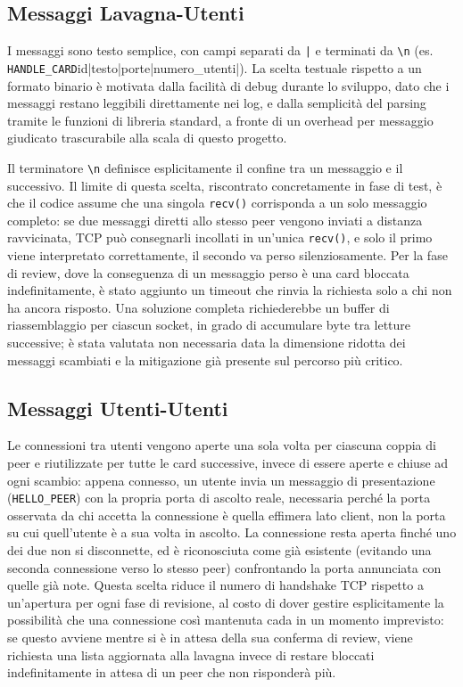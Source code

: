 \documentclass{article}
\begin{document}
\subsection{Messaggi Lavagna-Utenti}
I messaggi sono testo semplice, con campi separati da \verb`|` e terminati da \verb|\n| (es. \verb|HANDLE_CARD|id|testo|porte|numero\_utenti|). La scelta testuale rispetto a un formato binario è motivata dalla facilità di debug durante lo sviluppo, dato che i messaggi restano leggibili direttamente nei log, e dalla semplicità del parsing tramite le funzioni di libreria standard, a fronte di un overhead per messaggio giudicato trascurabile alla scala di questo progetto.

Il terminatore \verb|\n| definisce esplicitamente il confine tra un messaggio e il successivo. Il limite di questa scelta, riscontrato concretamente in fase di test, è che il codice assume che una singola \verb|recv()| corrisponda a un solo messaggio completo: se due messaggi diretti allo stesso peer vengono inviati a distanza ravvicinata, TCP può consegnarli incollati in un'unica \verb|recv()|, e solo il primo viene interpretato correttamente, il secondo va perso silenziosamente. Per la fase di review, dove la conseguenza di un messaggio perso è una card bloccata indefinitamente, è stato aggiunto un timeout che rinvia la richiesta solo a chi non ha ancora risposto. Una soluzione completa richiederebbe un buffer di riassemblaggio per ciascun socket, in grado di accumulare byte tra letture successive; è stata valutata non necessaria data la dimensione ridotta dei messaggi scambiati e la mitigazione già presente sul percorso più critico.

\subsection{Messaggi Utenti-Utenti}
Le connessioni tra utenti vengono aperte una sola volta per ciascuna coppia di peer e riutilizzate per tutte le card successive, invece di essere aperte e chiuse ad ogni scambio: appena connesso, un utente invia un messaggio di presentazione (\verb|HELLO_PEER|) con la propria porta di ascolto reale, necessaria perché la porta osservata da chi accetta la connessione è quella effimera lato client, non la porta su cui quell'utente è a sua volta in ascolto. La connessione resta aperta finché uno dei due non si disconnette, ed è riconosciuta come già esistente (evitando una seconda connessione verso lo stesso peer) confrontando la porta annunciata con quelle già note.
Questa scelta riduce il numero di handshake TCP rispetto a un'apertura per ogni fase di revisione, al costo di dover gestire esplicitamente la possibilità che una connessione così mantenuta cada in un momento imprevisto: se questo avviene mentre si è in attesa della sua conferma di review, viene richiesta una lista aggiornata alla lavagna invece di restare bloccati indefinitamente in attesa di un peer che non risponderà più.
\end{document}
